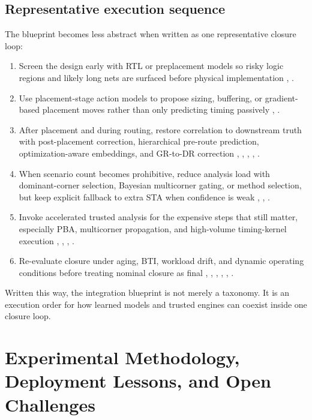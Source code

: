 \documentclass[num-refs]{wiley-article}
\begin{document}
  \subsection{Representative execution sequence}

  The blueprint becomes less abstract when written as one representative closure loop:


  \begin{enumerate}
  \item Screen the design early with RTL or preplacement models so risky logic regions and likely long nets are surfaced before physical implementation \cite{ref27}, \cite{ref29}.
  \item Use placement-stage action models to propose sizing, buffering, or gradient-based placement moves rather than only predicting timing passively \cite{ref1}, \cite{ref3}.
  \item After placement and during routing, restore correlation to downstream truth with post-placement correction, hierarchical pre-route prediction, optimization-aware embeddings, and GR-to-DR correction \cite{ref25}, \cite{ref13}, \cite{ref17}, \cite{ref8}, \cite{ref10}.
  \item When scenario count becomes prohibitive, reduce analysis load with dominant-corner selection, Bayesian multicorner gating, or method selection, but keep explicit fallback to extra STA when confidence is weak \cite{ref28}, \cite{ref16}, \cite{ref9}.
  \item Invoke accelerated trusted analysis for the expensive steps that still matter, especially PBA, multicorner propagation, and high-volume timing-kernel execution \cite{ref21}, \cite{ref22}, \cite{ref11}, \cite{ref12}.
  \item Re-evaluate closure under aging, BTI, workload drift, and dynamic operating conditions before treating nominal closure as final \cite{ref14}, \cite{ref15}, \cite{ref23}, \cite{ref44}, \cite{ref38}, \cite{ref26}.
  \end{enumerate}

  Written this way, the integration blueprint is not merely a taxonomy. It is an execution order for how learned models and trusted engines can coexist inside one closure loop.


  \section{Experimental Methodology, Deployment Lessons, and Open Challenges}
\end{document}
